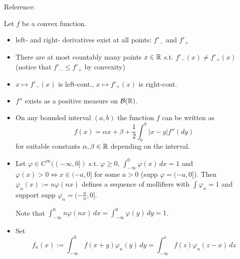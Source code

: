 \begin{remark}
    Reference: 

    Let $f$ be a convex function.
    \begin{itemize}
        \item left- and right- derivatives exist at all points: $f'_-$ and $f'_+$
        \item There are at most countably many points $x \in \mathbb R$ s.t. $f'_-(x) \neq f'_+(x)$ (notice that $f'_- \leq f'_+$ by convexity)
        \item $x \mapsto f'_-(x)$ is left-cont., $x \mapsto f'_+(x)$ is right-cont.
        \item $f''$ exists as a positive measure on $\mathcal{B}(\mathbb R)$.
        \item On any bounded interval $(a,b)$ the function $f$ can be written as 
        \[ f(x) = \alpha x + \beta + \frac{1}{2} \int_a^b |x-y| f''(dy) \]
        for suitable constants $\alpha, \beta \in \mathbb R$ depending on the interval.
        \item Let $\varphi \in C^\infty((-\infty, 0])$ s.t. $\varphi \geq 0$, $\int_{-\infty}^0 \varphi(x) \, dx = 1$ and $\varphi(x) > 0 \iff x \in (-a, 0]$ for some $a > 0$ (supp $\varphi = (-a, 0]$).
        Then $\varphi_n(x) := n \varphi(nx)$ defines a sequence of mollifiers with $\int \varphi_n = 1$ and support $\text{supp } \varphi_n = (-\frac{a}{n}, 0]$.
        
        Note that $\int_{-\infty}^0 n \varphi(nx) \, dx = \int_{-\infty}^0 \varphi(y) \, dy = 1$.
        \item Set 
        \[ f_n(x) := \int_{-\infty}^0 f(x+y) \varphi_n(y) \, dy = \int_{-\infty}^x f(z) \varphi_n(z-x) \, dz \]
    \end{itemize}
\end{remark}

